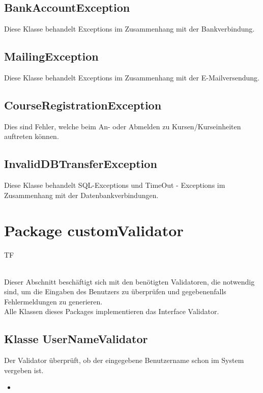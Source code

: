 	\subsection{BankAccountException}
	Diese Klasse behandelt Exceptions im Zusammenhang mit der Bankverbindung.
	
	\subsection{MailingException}
	Diese Klasse behandelt Exceptions im Zusammenhang mit der E-Mailversendung.
	
	\subsection{CourseRegistrationException}
	Dies sind Fehler, welche beim An- oder Abmelden zu Kursen/Kurseinheiten auftreten können. 
	
	\subsection{InvalidDBTransferException}
	Diese Klasse behandelt SQL-Exceptions und  TimeOut - Exceptions im Zusammenhang mit der Datenbankverbindungen.
	
	\section{Package customValidator}
	\begin{tiny}
		TF\\
	\end{tiny}\\
	Dieser Abschnitt beschäftigt sich mit den benötigten Validatoren, die notwendig sind, um die Eingaben des Benutzers zu überprüfen und gegebenenfalls Fehlermeldungen zu generieren.\\
	Alle Klassen dieses Packages implementieren das Interface Validator.
	
	\subsection{Klasse UserNameValidator}
	Der Validator überprüft, ob der eingegebene Benutzername schon im System vergeben ist.
	\begin{itemize}
		\item \override
	\end{itemize}
	
